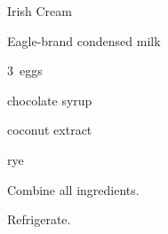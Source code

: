 \begin{recipe}{Irish Cream}{}{}

\begin{ingredients}
\item {} Eagle-brand condensed milk
\item 3~eggs
\item {} chocolate syrup
\item \tp{\half} coconut extract
\item {} rye
\end{ingredients}

\begin{directions}
\item Combine all ingredients.
\item Refrigerate.
\end{directions}

\end{recipe}
